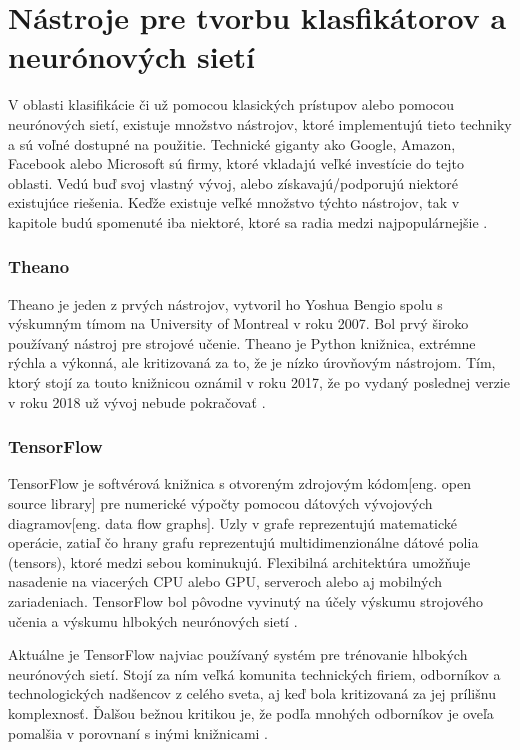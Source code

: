
\section{Nástroje pre tvorbu klasfikátorov a neurónových sietí}
\label{sec:frameworks}
V oblasti klasifikácie či už pomocou klasických prístupov alebo pomocou neurónových sietí, existuje množstvo nástrojov,
    ktoré implementujú tieto techniky a sú voľné dostupné na použitie.
Technické giganty ako Google, Amazon, Facebook alebo Microsoft sú firmy, ktoré vkladajú veľké investície do tejto oblasti.
Vedú buď svoj vlastný vývoj, alebo získavajú/podporujú niektoré existujúce riešenia.
Keďže existuje veľké množstvo týchto nástrojov, tak v kapitole budú spomenuté iba niektoré, ktoré sa radia medzi najpopulárnejšie \cite{odkaz:FrameworkComparison}.

\subsubsection{Theano}
Theano je jeden z prvých nástrojov, vytvoril ho Yoshua Bengio spolu s výskumným tímom na University of Montreal v roku 2007.
Bol prvý široko používaný nástroj pre strojové učenie.
Theano je Python knižnica, extrémne rýchla a výkonná, ale kritizovaná za to, že je nízko úrovňovým nástrojom.
Tím, ktorý stojí za touto knižnicou oznámil v roku 2017, že po vydaný poslednej verzie v roku 2018 už vývoj nebude pokračovať \cite{odkaz:FrameworkComparison}.

\subsubsection{TensorFlow}
TensorFlow je softvérová knižnica s otvoreným zdrojovým kódom[eng. open source library] pre numerické výpočty pomocou dátových vývojových diagramov[eng. data flow graphs].
Uzly v grafe reprezentujú matematické operácie, zatiaľ čo hrany grafu reprezentujú multidimenzionálne dátové polia (tensors), ktoré medzi sebou kominukujú.
Flexibilná architektúra umožňuje nasadenie na viacerých CPU alebo GPU, serveroch alebo aj mobilných zariadeniach.
TensorFlow bol pôvodne vyvinutý na účely výskumu strojového učenia a výskumu hlbokých neurónových sietí \cite{odkaz:TensorFlow}.

Aktuálne je TensorFlow najviac používaný systém pre trénovanie hlbokých neurónových sietí.
Stojí za ním veľká komunita technických firiem, odborníkov a technologických nadšencov z celého sveta, aj keď bola kritizovaná za jej prílišnu komplexnosť.
Ďalšou bežnou kritikou je, že podľa mnohých odborníkov je oveľa pomalšia v porovnaní s inými knižnicami \cite{odkaz:FrameworkComparison}.


